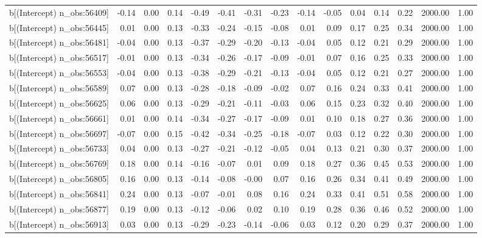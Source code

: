 \begin{table}[ht]
\begin{tabular}{rrrrrrrrrrrrrrr}
  b[(Intercept) n\_obs:56409] & -0.14 & 0.00 & 0.14 & -0.49 & -0.41 & -0.31 & -0.23 & -0.14 & -0.05 & 0.04 & 0.14 & 0.22 & 2000.00 & 1.00 \\ 
  b[(Intercept) n\_obs:56445] & 0.01 & 0.00 & 0.13 & -0.33 & -0.24 & -0.15 & -0.08 & 0.01 & 0.09 & 0.17 & 0.25 & 0.34 & 2000.00 & 1.00 \\ 
  b[(Intercept) n\_obs:56481] & -0.04 & 0.00 & 0.13 & -0.37 & -0.29 & -0.20 & -0.13 & -0.04 & 0.05 & 0.12 & 0.21 & 0.29 & 2000.00 & 1.00 \\ 
  b[(Intercept) n\_obs:56517] & -0.01 & 0.00 & 0.13 & -0.34 & -0.26 & -0.17 & -0.09 & -0.01 & 0.07 & 0.16 & 0.25 & 0.33 & 2000.00 & 1.00 \\ 
  b[(Intercept) n\_obs:56553] & -0.04 & 0.00 & 0.13 & -0.38 & -0.29 & -0.21 & -0.13 & -0.04 & 0.05 & 0.12 & 0.21 & 0.27 & 2000.00 & 1.00 \\ 
  b[(Intercept) n\_obs:56589] & 0.07 & 0.00 & 0.13 & -0.28 & -0.18 & -0.09 & -0.02 & 0.07 & 0.16 & 0.24 & 0.33 & 0.41 & 2000.00 & 1.00 \\ 
  b[(Intercept) n\_obs:56625] & 0.06 & 0.00 & 0.13 & -0.29 & -0.21 & -0.11 & -0.03 & 0.06 & 0.15 & 0.23 & 0.32 & 0.40 & 2000.00 & 1.00 \\ 
  b[(Intercept) n\_obs:56661] & 0.01 & 0.00 & 0.14 & -0.34 & -0.27 & -0.17 & -0.09 & 0.01 & 0.10 & 0.18 & 0.27 & 0.36 & 2000.00 & 1.00 \\ 
  b[(Intercept) n\_obs:56697] & -0.07 & 0.00 & 0.15 & -0.42 & -0.34 & -0.25 & -0.18 & -0.07 & 0.03 & 0.12 & 0.22 & 0.30 & 2000.00 & 1.00 \\ 
  b[(Intercept) n\_obs:56733] & 0.04 & 0.00 & 0.13 & -0.27 & -0.21 & -0.12 & -0.05 & 0.04 & 0.13 & 0.21 & 0.30 & 0.37 & 2000.00 & 1.00 \\ 
  b[(Intercept) n\_obs:56769] & 0.18 & 0.00 & 0.14 & -0.16 & -0.07 & 0.01 & 0.09 & 0.18 & 0.27 & 0.36 & 0.45 & 0.53 & 2000.00 & 1.00 \\ 
  b[(Intercept) n\_obs:56805] & 0.16 & 0.00 & 0.13 & -0.14 & -0.08 & -0.00 & 0.07 & 0.16 & 0.26 & 0.34 & 0.41 & 0.49 & 2000.00 & 1.00 \\ 
  b[(Intercept) n\_obs:56841] & 0.24 & 0.00 & 0.13 & -0.07 & -0.01 & 0.08 & 0.16 & 0.24 & 0.33 & 0.41 & 0.51 & 0.58 & 2000.00 & 1.00 \\ 
  b[(Intercept) n\_obs:56877] & 0.19 & 0.00 & 0.13 & -0.12 & -0.06 & 0.02 & 0.10 & 0.19 & 0.28 & 0.36 & 0.46 & 0.52 & 2000.00 & 1.00 \\ 
  b[(Intercept) n\_obs:56913] & 0.03 & 0.00 & 0.13 & -0.29 & -0.23 & -0.14 & -0.06 & 0.03 & 0.12 & 0.20 & 0.29 & 0.37 & 2000.00 & 1.00 \\ 

\end{tabular}
\end{table}
